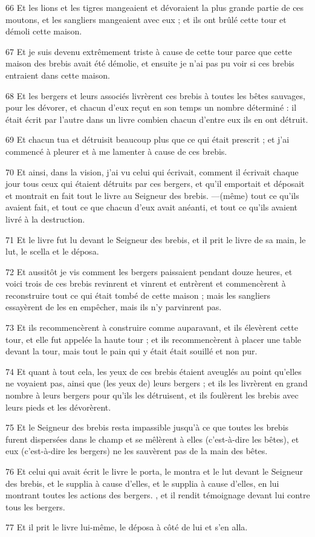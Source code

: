 \par 66 Et les lions et les tigres mangeaient et dévoraient la plus grande partie de ces moutons, et les sangliers mangeaient avec eux ; et ils ont brûlé cette tour et démoli cette maison.
\par 67 Et je suis devenu extrêmement triste à cause de cette tour parce que cette maison des brebis avait été démolie, et ensuite je n'ai pas pu voir si ces brebis entraient dans cette maison.
\par 68 Et les bergers et leurs associés livrèrent ces brebis à toutes les bêtes sauvages, pour les dévorer, et chacun d'eux reçut en son temps un nombre déterminé : il était écrit par l'autre dans un livre combien chacun d'entre eux ils en ont détruit.
\par 69 Et chacun tua et détruisit beaucoup plus que ce qui était prescrit ; et j'ai commencé à pleurer et à me lamenter à cause de ces brebis.
\par 70 Et ainsi, dans la vision, j'ai vu celui qui écrivait, comment il écrivait chaque jour tous ceux qui étaient détruits par ces bergers, et qu'il emportait et déposait et montrait en fait tout le livre au Seigneur des brebis. —(même) tout ce qu'ils avaient fait, et tout ce que chacun d'eux avait anéanti, et tout ce qu'ils avaient livré à la destruction.
\par 71 Et le livre fut lu devant le Seigneur des brebis, et il prit le livre de sa main, le lut, le scella et le déposa.
\par 72 Et aussitôt je vis comment les bergers paissaient pendant douze heures, et voici trois de ces brebis revinrent et vinrent et entrèrent et commencèrent à reconstruire tout ce qui était tombé de cette maison ; mais les sangliers essayèrent de les en empêcher, mais ils n'y parvinrent pas.
\par 73 Et ils recommencèrent à construire comme auparavant, et ils élevèrent cette tour, et elle fut appelée la haute tour ; et ils recommencèrent à placer une table devant la tour, mais tout le pain qui y était était souillé et non pur.
\par 74 Et quant à tout cela, les yeux de ces brebis étaient aveuglés au point qu'elles ne voyaient pas, ainsi que (les yeux de) leurs bergers ; et ils les livrèrent en grand nombre à leurs bergers pour qu'ils les détruisent, et ils foulèrent les brebis avec leurs pieds et les dévorèrent.
\par 75 Et le Seigneur des brebis resta impassible jusqu'à ce que toutes les brebis furent dispersées dans le champ et se mêlèrent à elles (c'est-à-dire les bêtes), et eux (c'est-à-dire les bergers) ne les sauvèrent pas de la main des bêtes.
\par 76 Et celui qui avait écrit le livre le porta, le montra et le lut devant le Seigneur des brebis, et le supplia à cause d'elles, et le supplia à cause d'elles, en lui montrant toutes les actions des bergers. , et il rendit témoignage devant lui contre tous les bergers.
\par 77 Et il prit le livre lui-même, le déposa à côté de lui et s'en alla.

